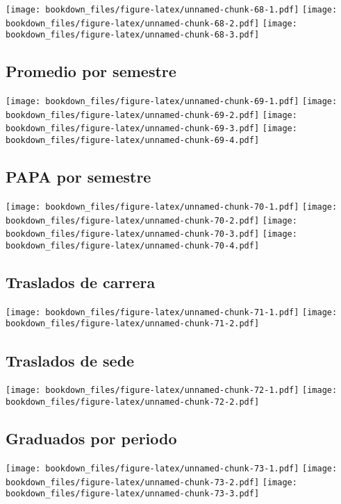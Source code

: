 \documentclass[]{article}
\theoremstyle{definition}
\theoremstyle{definition}
\theoremstyle{definition}
\theoremstyle{remark}
\begin{document}
\texttt{[image: bookdown\_files/figure-latex/unnamed-chunk-68-1.pdf]}
\texttt{[image: bookdown\_files/figure-latex/unnamed-chunk-68-2.pdf]}
\texttt{[image: bookdown\_files/figure-latex/unnamed-chunk-68-3.pdf]}

\subsection{Promedio por semestre}\label{promedio-por-semestre}

\texttt{[image: bookdown\_files/figure-latex/unnamed-chunk-69-1.pdf]}
\texttt{[image: bookdown\_files/figure-latex/unnamed-chunk-69-2.pdf]}
\texttt{[image: bookdown\_files/figure-latex/unnamed-chunk-69-3.pdf]}
\texttt{[image: bookdown\_files/figure-latex/unnamed-chunk-69-4.pdf]}

\subsection{PAPA por semestre}\label{papa-por-semestre}

\texttt{[image: bookdown\_files/figure-latex/unnamed-chunk-70-1.pdf]}
\texttt{[image: bookdown\_files/figure-latex/unnamed-chunk-70-2.pdf]}
\texttt{[image: bookdown\_files/figure-latex/unnamed-chunk-70-3.pdf]}
\texttt{[image: bookdown\_files/figure-latex/unnamed-chunk-70-4.pdf]}

\subsection{Traslados de carrera}\label{traslados-de-carrera}

\texttt{[image: bookdown\_files/figure-latex/unnamed-chunk-71-1.pdf]}
\texttt{[image: bookdown\_files/figure-latex/unnamed-chunk-71-2.pdf]}

\subsection{Traslados de sede}\label{traslados-de-sede}

\texttt{[image: bookdown\_files/figure-latex/unnamed-chunk-72-1.pdf]}
\texttt{[image: bookdown\_files/figure-latex/unnamed-chunk-72-2.pdf]}

\subsection{Graduados por periodo}\label{graduados-por-periodo}

\texttt{[image: bookdown\_files/figure-latex/unnamed-chunk-73-1.pdf]}
\texttt{[image: bookdown\_files/figure-latex/unnamed-chunk-73-2.pdf]}
\texttt{[image: bookdown\_files/figure-latex/unnamed-chunk-73-3.pdf]}
\end{document}
